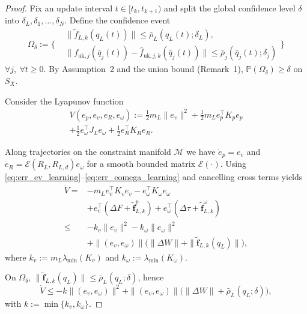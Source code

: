 \documentclass[letterpaper, 10 pt, conference]{ieeeconf}  %
\newcommand{\0}{\matr{0}}
\begin{document}
\begin{proof}
Fix an update interval $t\in[t_k,t_{k+1})$ and split the global confidence level $\delta$
into $\delta_L,\delta_1,\dots,\delta_N$. Define the confidence event
\begin{equation}
\Omega_\delta :=
\Big\{
\begin{aligned}
&\|\tilde f_{L,k}(q_L(t))\|\le \bar\rho_L(q_L(t);\delta_L),\\
&\|f_{\mathrm{uk},j}(\bar q_j(t))-\hat f_{\mathrm{uk},j,k}(\bar q_j(t))\|
\le \bar\rho_j(\bar q_j(t);\delta_j)
\end{aligned}
\Big\} 
\label{eq:Omega_delta_union}
\end{equation}  $\forall j,\ \forall t\ge 0$. 
By Assumption~2 and the union bound (Remark~1), $\mathbb{P}(\Omega_\delta)\ge \delta$ on $S_X$.

Consider the Lyapunov function
\begin{align*}
V(e_p,e_v,e_R,e_\omega)
:= \tfrac12 m_L\|e_v\|^2 + \tfrac12 m_L e_p^\top K_p e_p\\
+ \tfrac12 e_\omega^\top J_L e_\omega + \tfrac12 e_R^\top K_R e_R .\end{align*}

Along trajectories on the constraint manifold $\mathcal M$ we have
$\dot e_p=e_v$ and $\dot e_R=\mathcal E(R_L,R_{L,d})e_\omega$ for a smooth bounded matrix
$\mathcal E(\cdot)$. Using \eqref{eq:err_ev_learning}--\eqref{eq:err_eomega_learning} and cancelling cross terms yields
\begin{equation}
\label{eq:Vdot_bound_38}
\begin{aligned}
\dot V
=& -m_L e_v^\top K_v e_v - e_\omega^\top K_\omega e_\omega
\\&+ e_v^\top(\Delta F+\tilde{\mathbf f}^p_{L,k})
+ e_\omega^\top(\Delta\tau+\tilde{\mathbf f}^\omega_{L,k})\\
\le &-k_v\|e_v\|^2 - k_\omega\|e_\omega\|^2\\
&+ \|(e_v,e_\omega)\|\Big(\|\Delta W\|+\|\tilde{\mathbf f}_{L,k}(q_L)\|\Big),
\end{aligned}
\end{equation}
where $k_v:=m_L\lambda_{\min}(K_v)$ and $k_\omega:=\lambda_{\min}(K_\omega)$.

On $\Omega_\delta$, $\|\tilde{\mathbf f}_{L,k}(q_L)\|\le \bar\rho_L(q_L;\delta)$, hence
\begin{equation}
\label{eq:Vdot_bound_k}
\dot V \le -k\|(e_v,e_\omega)\|^2
+ \|(e_v,e_\omega)\|\Big(\|\Delta W\|+\bar\rho_L(q_L;\delta)\Big),
\end{equation}
with $k:=\min\{k_v,k_\omega\}$.



\end{proof}
\end{document}
